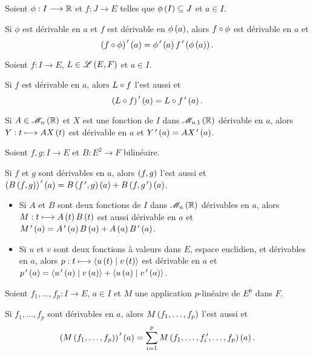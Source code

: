 \begin{prop}
Soient \(\phi:I\longrightarrow\mathbb{R}\) et \(f:J\to E\) telles que \(\phi\left(I\right)\subseteq J\) et \(a\in I\).

Si \(\phi\) est dérivable en \(a\) et \(f\) est dérivable en \(\phi\left(a\right)\), alors \(f\circ\phi\) est dérivable en \(a\) et \[\left(f\circ\phi\right)^{\,\prime}\left(a\right)=\phi^{\,\prime}\left(a\right)f^{\,\prime}\left(\phi\left(a\right)\right).\]
\end{prop}

\begin{prop}
Soient \(f:I\to E\), \(L\in\mathscr{L}\left(E,F\right)\) et \(a\in I\).

Si \(f\) est dérivable en \(a\), alors \(L\circ f\) l'est aussi et \[\left(L\circ f\right)^{\,\prime}\left(a\right)=L\circ f^{\,\prime}\left(a\right).\]
\end{prop}

\begin{ex}
Si \(A\in\M{n}[\R]\) et \(X\) est une fonction de \(I\) dans \(\M{n\,1}[\R]\) dérivable en \(a\), alors \(Y:t\longmapsto AX\left(t\right)\) est dérivable en \(a\) et \(Y^{\,\prime}\left(a\right)=AX^{\,\prime}\left(a\right)\).
\end{ex}

\begin{prop}
Soient \(f,g:I\to E\) et \(B:E^2\to F\) bilinéaire.

Si \(f\) et \(g\) sont dérivables en \(a\), alors \(\left(f,g\right)\) l'est aussi et \(\left(B\left(f,g\right)\right)^{\,\prime}\left(a\right)=B\left(f^{\,\prime},g\right)\left(a\right)+B\left(f,g^{\,\prime}\right)\left(a\right)\).
\end{prop}

\begin{ex}
\begin{itemize}
    \item Si \(A\) et \(B\) sont deux fonctions de \(I\) dans \(\M{n}[\R]\) dérivables en \(a\), alors \(M:t\longmapsto A\left(t\right)B\left(t\right)\) est aussi dérivable en \(a\) et \(M^{\,\prime}\left(a\right)=A^{\,\prime}\left(a\right)B\left(a\right)+A\left(a\right)B^{\,\prime}\left(a\right)\). \\
    \item Si \(u\) et \(v\) sont deux fonctions à valeurs dans \(E\), espace euclidien, et dérivables en \(a\), alors \(p:t\mapsto\ps{u\paren{t}}{v\paren{t}}\) est dérivable en \(a\) et \(p\prim\paren{a}=\ps{u\prim\paren{a}}{v\paren{a}}+\ps{u\paren{a}}{v\prim\paren{a}}\).
\end{itemize}
\end{ex}

\begin{prop}
Soient \(f_1,\dots,f_p:I\to E\), \(a\in I\) et \(M\) une application \(p\)-linéaire de \(E^p\) dans \(F\).

Si \(f_1,\dots,f_p\) sont dérivables en \(a\), alors \(M\left(f_1,\dots,f_p\right)\) l'est aussi et \[\left(M\left(f_1,\dots,f_p\right)\right)^{\,\prime}\left(a\right)=\sum_{i=1}^pM\left(f_1,\dots,f_i^{\,\prime},\dots,f_p\right)\left(a\right).\]
\end{prop}

